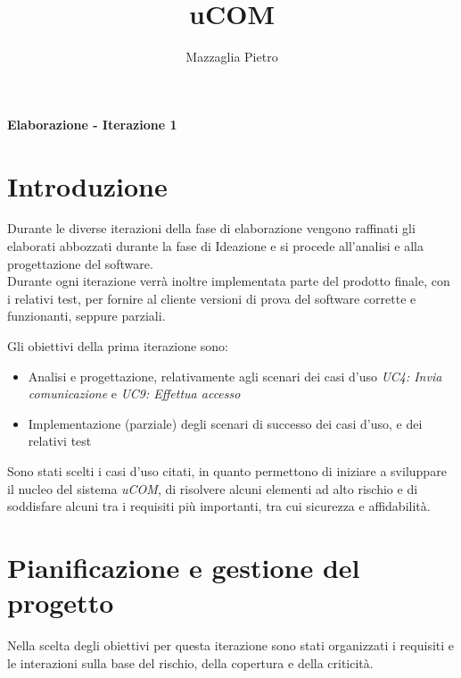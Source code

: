 \documentclass[12pt]{report}
\title{uCOM}
\author{Mazzaglia Pietro}
\begin{document}
	
	\huge \textbf{Elaborazione - Iterazione 1}
	
	\renewcommand{\thesection}{\arabic{section}}
	
	\normalsize
	

	\section{Introduzione}
	
	Durante le diverse iterazioni della fase di elaborazione vengono raffinati gli elaborati abbozzati durante la fase di Ideazione e si procede all'analisi e alla progettazione del software. \\
	Durante ogni iterazione verrà inoltre implementata parte del prodotto finale, con i relativi test, per fornire al cliente versioni di prova del software corrette e funzionanti, seppure parziali.
	
	Gli obiettivi della prima iterazione sono:
	\begin{itemize}
		\item Analisi e progettazione, relativamente agli scenari dei casi d'uso \textit{UC4: Invia comunicazione} e \textit{UC9: Effettua accesso}
		\item Implementazione (parziale) degli scenari di successo dei casi d'uso, e dei relativi test
	\end{itemize}
	
	Sono stati scelti i casi d'uso citati, in quanto permettono di iniziare a sviluppare il nucleo del sistema \textit{uCOM}, di risolvere alcuni elementi ad alto rischio e di soddisfare alcuni tra i requisiti più importanti, tra cui sicurezza e affidabilità.
	
	\section{Pianificazione e gestione del progetto}
	
	Nella scelta degli obiettivi per questa iterazione sono stati organizzati i requisiti e le interazioni sulla base del rischio, della copertura e della criticità. 
	
\end{document}
